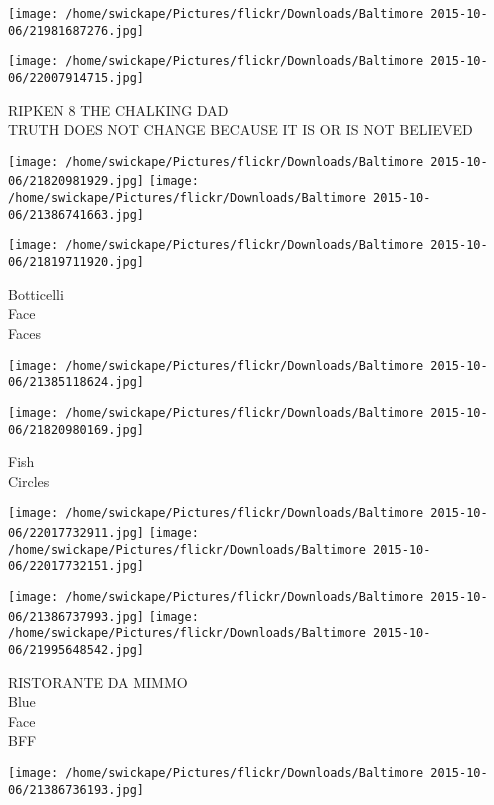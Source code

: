 \documentclass[10pt,letterpaper]{article}
\begin{document}
\texttt{[image: /home/swickape/Pictures/flickr/Downloads/Baltimore 2015-10-06/21981687276.jpg]}

\vspace{0.25in}
\texttt{[image: /home/swickape/Pictures/flickr/Downloads/Baltimore 2015-10-06/22007914715.jpg]}

RIPKEN 8 THE CHALKING DAD\\
TRUTH DOES NOT CHANGE BECAUSE IT IS OR IS NOT BELIEVED\\
\pagebreak

\texttt{[image: /home/swickape/Pictures/flickr/Downloads/Baltimore 2015-10-06/21820981929.jpg]}
\texttt{[image: /home/swickape/Pictures/flickr/Downloads/Baltimore 2015-10-06/21386741663.jpg]}

\vspace{0.25in}
\texttt{[image: /home/swickape/Pictures/flickr/Downloads/Baltimore 2015-10-06/21819711920.jpg]}

Botticelli\\
Face\\
Faces\\
\pagebreak

\texttt{[image: /home/swickape/Pictures/flickr/Downloads/Baltimore 2015-10-06/21385118624.jpg]}

\vspace{0.25in}
\texttt{[image: /home/swickape/Pictures/flickr/Downloads/Baltimore 2015-10-06/21820980169.jpg]}

Fish\\
Circles\\
\pagebreak

\texttt{[image: /home/swickape/Pictures/flickr/Downloads/Baltimore 2015-10-06/22017732911.jpg]}
\texttt{[image: /home/swickape/Pictures/flickr/Downloads/Baltimore 2015-10-06/22017732151.jpg]}

\texttt{[image: /home/swickape/Pictures/flickr/Downloads/Baltimore 2015-10-06/21386737993.jpg]}
\texttt{[image: /home/swickape/Pictures/flickr/Downloads/Baltimore 2015-10-06/21995648542.jpg]}

RISTORANTE DA MIMMO\\
Blue\\
Face\\
BFF\\
\pagebreak

\texttt{[image: /home/swickape/Pictures/flickr/Downloads/Baltimore 2015-10-06/21386736193.jpg]}
\end{document}
